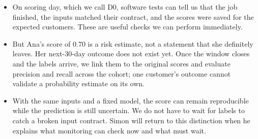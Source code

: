 \documentclass[11pt,a4paper]{article}
\begin{document}
\begin{examplebox}[title after break={SPOKEN SCRIPT --- slide 5 continued}]
\begin{itemize}
\item On scoring day, which we call D0, software tests can tell us that the job finished, the inputs matched their contract, and the scores were saved for the expected customers. These are useful checks we can perform immediately.
\item But Ana's score of 0.70 is a risk estimate, not a statement that she definitely leaves. Her next-30-day outcome does not exist yet. Once the window closes and the labels arrive, we link them to the original scores and evaluate precision and recall across the cohort; one customer's outcome cannot validate a probability estimate on its own.
\item With the same inputs and a fixed model, the score can remain reproducible while the prediction is still uncertain. We do not have to wait for labels to catch a broken input contract. Simon will return to this distinction when he explains what monitoring can check now and what must wait.
\end{itemize}
\end{examplebox}
\par\noindent{\scriptsize\textcolor{teal!60!black}{Reading anchor: Kalinowski, §13.2 · Bass, §14.1–14.1.4}}
\clearpage
\end{document}
